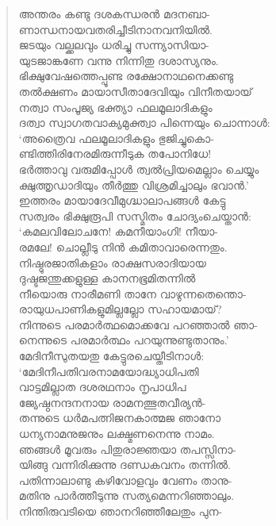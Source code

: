 \begin{verse}
അന്തരം കണ്ടു ദശകന്ധരന്‍ മദനബാ-\\
ണാന്ധനായവതരിച്ചീടിനാനവനിയില്‍.\\
ജടയും വല്ക്കലവും ധരിച്ചു സന്ന്യാസിയാ-\\
യുടജാങ്കണേ വന്നു നിന്നിതു ദശാസ്യനും.\\
ഭിക്ഷുവേഷത്തെപ്പൂണ്ട രക്ഷോനാഥനെക്കണ്ടു\\
തല്‍ക്ഷണം മായാസീതാദേവിയും വിനീതയായ്\\
നത്വാ സംപൂജ്യ ഭക്ത്യാ ഫലമൂലാദികളും\\
ദത്വാ സ്വാഗതവാക്യമുക്ത്വാ പിന്നെയും ചൊന്നാള്‍:\\
‘അത്രൈവ ഫലമൂലാദികളും ഭുജിച്ചുകൊ-\\
ണ്ടിത്തിരിനേരമിരുന്നീടുക തപോനിധേ!\\
ഭര്‍ത്താവു വരുമിപ്പോള്‍ ത്വല്‍പ്രിയമെല്ലാം ചെയ്യും\\
ക്ഷുത്തൃഡാദിയും തീര്‍ത്തു വിശ്രമിച്ചാലും ഭവാന്‍.’\\
ഇത്തരം മായാദേവീമുഗ്ദ്ധാലാപങ്ങള്‍ കേട്ടു\\
സത്വരം ഭിക്ഷുരൂപി സസ്മിതം ചോദ്യംചെയ്താന്‍:\\
‘കമലവിലോചനേ! കമനീയാംഗി! നീയാ-\\
രമലേ! ചൊല്ലീടു നിന്‍ കമിതാവാരെന്നതും.\\
നിഷ്ഠുരജാതികളാം രാക്ഷസരാദിയായ\\
ദുഷ്ടജന്തുക്കളുള്ള കാനനഭൂമിതന്നില്‍\\
നീയൊരു നാരീമണി താനേ വാഴുന്നതെന്തൊ-\\
രായുധപാണികളുമില്ലല്ലോ സഹായമായ്?\\
നിന്നുടെ പരമാര്‍ത്ഥമൊക്കവേ പറഞ്ഞാല്‍ ഞാ-\\
നെന്നുടെ പരമാര്‍ത്ഥം പറയുന്നുണ്ടുതാനും.’\\
മേദിനീസുതയതു കേട്ടുരചെയ്തീടിനാള്‍:\\
‘മേദിനീപതിവരനാമയോദ്ധ്യാധിപതി\\
വാട്ടമില്ലാത ദശരഥനാം നൃപാധിപ\\
ജ്യേഷ്ഠനന്ദനനായ രാമനത്ഭുതവീര്യന്‍-\\
തന്നുടെ ധര്‍മപത്നിജനകാത്മജ ഞാനോ\\
ധന്യനാമനുജനും ലക്ഷ്മണനെന്നു നാമം.\\
ഞങ്ങള്‍ മൂവരും പിതുരാജ്ഞയാ തപസ്സിനാ-\\
യിങ്ങു വന്നിരിക്കുന്നു ദണ്ഡകവനം തന്നില്‍.\\
പതിന്നാലാണ്ടു കഴിവോളവും വേണം താനു-\\
മതിനു പാര്‍ത്തീടുന്നു സത്യമെന്നറിഞ്ഞാലും.\\
നിന്തിരുവടിയെ ഞാനറിഞ്ഞീലേതും പുന-\\

\end{verse}
